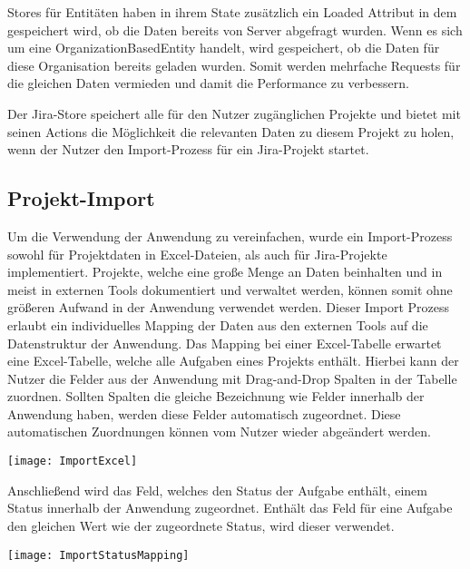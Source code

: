 Stores für Entitäten haben in ihrem State zusätzlich ein Loaded Attribut in dem gespeichert wird, ob die Daten bereits von Server abgefragt wurden. Wenn es sich um eine OrganizationBasedEntity handelt, wird gespeichert, ob die Daten für diese Organisation bereits geladen wurden. Somit werden mehrfache Requests für die gleichen Daten vermieden und damit die Performance zu verbessern.

Der Jira-Store speichert alle für den Nutzer zugänglichen Projekte und bietet mit seinen Actions die Möglichkeit die relevanten Daten zu diesem Projekt zu holen, wenn der Nutzer den Import-Prozess für ein Jira-Projekt startet.

\subsection{Projekt-Import}
Um die Verwendung der Anwendung zu vereinfachen, wurde ein Import-Prozess sowohl für Projektdaten in Excel-Dateien, als auch für Jira-Projekte implementiert. Projekte, welche eine große Menge an Daten beinhalten und in meist in externen Tools dokumentiert und verwaltet werden, können somit ohne größeren Aufwand in der Anwendung verwendet werden. Dieser Import Prozess erlaubt ein individuelles Mapping der Daten aus den externen Tools auf die Datenstruktur der Anwendung. Das Mapping bei einer Excel-Tabelle erwartet eine Excel-Tabelle, welche alle Aufgaben eines Projekts enthält. Hierbei kann der Nutzer  die Felder aus der Anwendung mit Drag-and-Drop Spalten in der Tabelle zuordnen. Sollten Spalten die gleiche Bezeichnung wie Felder innerhalb der Anwendung haben, werden diese Felder automatisch zugeordnet. Diese automatischen Zuordnungen können vom Nutzer wieder abgeändert werden.

\vspace{20pt}
\begin{center}
    \begin{minipage}{1\linewidth}
        \texttt{[image: ImportExcel]}
    \end{minipage}
\end{center}
\vspace{20pt}

Anschließend wird das Feld, welches den Status der Aufgabe enthält, einem Status innerhalb der Anwendung zugeordnet. Enthält das Feld für eine Aufgabe den gleichen Wert wie der zugeordnete Status, wird dieser verwendet.

\vspace{20pt}
\begin{center}
    \begin{minipage}{1\linewidth}
        \texttt{[image: ImportStatusMapping]}
    \end{minipage}
\end{center}
\vspace{20pt}

